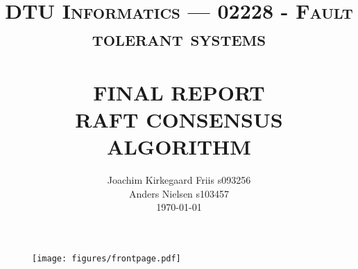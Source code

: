 \documentclass[paper=a4, fontsize=11pt]{scrartcl}		%
\title{	\normalsize \textsc{DTU Informatics --- 02228 - Fault tolerant systems} 	%
		 	\\													%
			\HRule{0.5pt} \\										%
			\LARGE \textbf{\uppercase{Final report \\ Raft consensus algorithm
}}	%
			\HRule{2pt} \\ [0.5cm]								%
		}
\makeatletter
\def\printtitle{%
    {\centering \@title\par}}
\def\printauthor{%
    {\centering \large \@author}}
\makeatother
\begin{document}
\thispagestyle{empty}				%

\printtitle									%
  	\vfill
  	\author{Joachim Kirkegaard Friis s093256 \\ Anders Nielsen s103457 \\ \vspace{0.2cm} \today}
  		\begin{figure}[h]
  	  		\centering
  	  		\texttt{[image: figures/frontpage.pdf]}
  	  	\end{figure}
\printauthor								%
\newpage

\tableofcontents
\thispagestyle{empty}       %
\newpage











{}


\appendix


\end{document}
